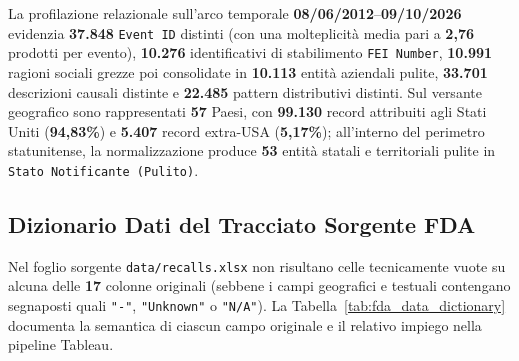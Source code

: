 La profilazione relazionale sull'arco temporale \textbf{08/06/2012}--\textbf{09/10/2026} evidenzia \textbf{37.848} \texttt{Event ID} distinti (con una molteplicità media pari a \textbf{2,76} prodotti per evento), \textbf{10.276} identificativi di stabilimento \texttt{FEI Number}, \textbf{10.991} ragioni sociali grezze poi consolidate in \textbf{10.113} entità aziendali pulite, \textbf{33.701} descrizioni causali distinte e \textbf{22.485} pattern distributivi distinti. Sul versante geografico sono rappresentati \textbf{57} Paesi, con \textbf{99.130} record attribuiti agli Stati Uniti (\textbf{94,83\%}) e \textbf{5.407} record extra-USA (\textbf{5,17\%}); all'interno del perimetro statunitense, la normalizzazione produce \textbf{53} entità statali e territoriali pulite in \texttt{Stato Notificante (Pulito)}.

\subsection{Dizionario Dati del Tracciato Sorgente FDA}
Nel foglio sorgente \texttt{data/recalls.xlsx} non risultano celle tecnicamente vuote su alcuna delle \textbf{17} colonne originali (sebbene i campi geografici e testuali contengano segnaposti quali \texttt{"-"}, \texttt{"Unknown"} o \texttt{"N/A"}). La Tabella~\ref{tab:fda_data_dictionary} documenta la semantica di ciascun campo originale e il relativo impiego nella pipeline Tableau.

